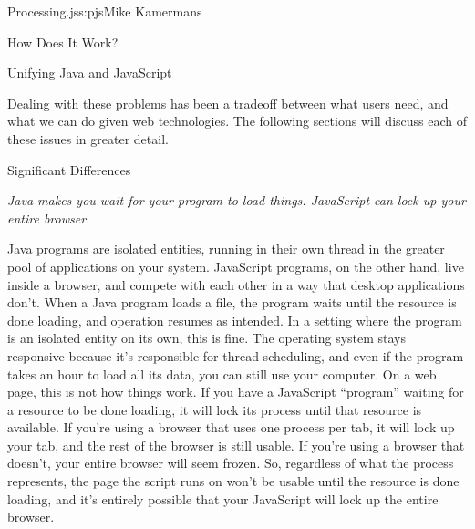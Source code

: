 \begin{aosachapter}{Processing.js}{s:pjs}{Mike Kamermans}
\begin{aosasect1}{How Does It Work?}
\begin{aosasect2}{Unifying Java and JavaScript}
\begin{aosaenumerate}
\end{aosaenumerate}

Dealing with these problems has been a tradeoff between what users
need, and what we can do given web technologies. The following
sections will discuss each of these issues in greater detail.

\end{aosasect2}

\end{aosasect1}

\begin{aosasect1}{Significant Differences}


\emph{Java makes you wait for your program to load things. JavaScript can lock up your entire browser.}

Java programs are isolated entities, running in their own thread in
the greater pool of applications on your system. JavaScript programs,
on the other hand, live inside a browser, and compete with each other
in a way that desktop applications don't. When a Java program loads a
file, the program waits until the resource is done loading, and
operation resumes as intended. In a setting where the program is an
isolated entity on its own, this is fine. The operating system stays
responsive because it's responsible for thread scheduling, and even if
the program takes an hour to load all its data, you can still use your
computer. On a web page, this is not how things work. If you have a
JavaScript ``program'' waiting for a resource to be done loading, it
will lock its process until that resource is available. If you're
using a browser that uses one process per tab, it will lock up your tab,
and the rest of the browser is still usable. If you're using a browser
that doesn't, your entire browser will seem frozen. So, regardless of
what the process represents, the page the script runs on won't be
usable until the resource is done loading, and it's entirely possible
that your JavaScript will lock up the entire browser.


\end{aosasect1}
\end{aosachapter}
